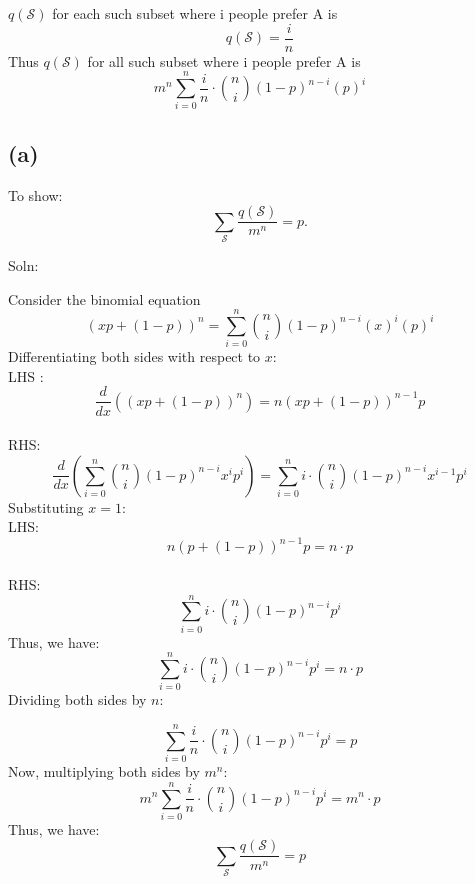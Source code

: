 \documentclass{report}
\begin{document}
\(q(\mathcal{S})\) for each such subset where i people prefer A is 
\[q(\mathcal{S}) = \frac{i}{n}\]
 Thus \(q(\mathcal{S})\) for all such subset where i people prefer A is 
\[m^n \sum_{i=0}^{n} \frac{i}{n} \cdot \binom{n}{i}(1-p) ^{n - i} (p)^i\] 

\subsection*{(a)}
To show:
\[
\sum_\mathcal{S} \frac{q(\mathcal{S})}{m^{n}} = p.
\]

Soln:

Consider the binomial equation
\[(xp + (1-p))^n = \sum_{i=0}^{n}\binom{n}{i}(1-p) ^{n - i} (x)^i(p)^i\]
Differentiating both sides with respect to \(x\):
\\LHS : 
\[\frac{d}{dx}((xp + (1-p))^n) = n(xp + (1-p))^{n-1}p\]
\\RHS:
\[\frac{d}{dx}(\sum_{i=0}^{n}\binom{n}{i}(1-p)^{n-i}x^i p^i) = \sum_{i=0}^{n} i \cdot \binom{n}{i}(1-p)^{n-i}x^{i-1}p^i\]
Substituting \(x = 1\):
\\LHS:
\[n(p + (1-p))^{n-1}p = n \cdot p\]
\\RHS:
\[\sum_{i=0}^{n} i \cdot \binom{n}{i}(1-p)^{n-i}p^i\]
Thus, we have:
\begin{equation}
\sum_{i=0}^{n} i \cdot \binom{n}{i}(1-p)^{n-i}p^i = n \cdot p
\label{eq:binomial_diff}
\end{equation}
Dividing both sides by \(n\):

\[\sum_{i=0}^{n} \frac{i}{n} \cdot \binom{n}{i}(1-p)^{n-i}p^i = p\]
Now, multiplying both sides by \(m^n\):
\[m^n \sum_{i=0}^{n} \frac{i}{n} \cdot \binom{n}{i}(1-p)^{n-i}p^i = m^n \cdot p\]
Thus, we have:
\[\sum_\mathcal{S} \frac{q(\mathcal{S})}{m^{n}} = p\]
\end{document}
